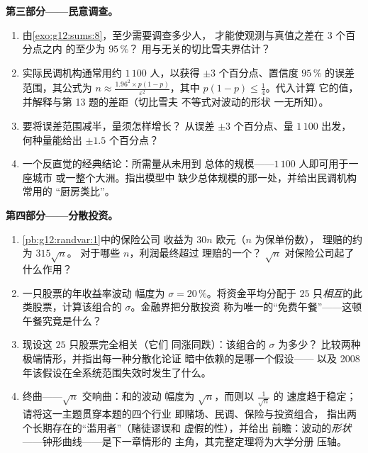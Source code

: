 \begin{problem}
\medskip
\noindent\textbf{第三部分——民意调查。}
\begin{enumerate}[resume]
  \item 由\cref{exo:g12:sums:8}，至少需要调查多少人，
        才能使观测与真值之差在 $3$ 个百分点之内
        的至少为 $95\,\%$？
        用与无关的切比雪夫界估计？
  \item 实际民调机构通常用约 $1\,100$ 人，以获得
        $\pm 3$ 个百分点、置信度 $95\,\%$ 的误差范围，其公式为
        $n \approx \frac{1.96^2 \times p(1-p)}
        {\varepsilon^2}$，其中 $p(1-p) \leq \frac14$。代入计算
        它的值，并解释与第 13 题的差距（切比雪夫
        不等式对波动的形状
        一无所知）。
  \item 要将误差范围减半，量须怎样增长？
        从误差 $\pm 3$ 个百分点、量 $1\,100$ 出发，
        何种量能给出 $\pm 1.5$ 个百分点？
  \item 一个反直觉的经典结论：所需量从未用到
        总体的规模——$1\,100$ 人即可用于一座城市
        或一整个大洲。指出模型中
        缺少总体规模的那一处，并给出民调机构常用的
        “厨房类比”。
\end{enumerate}

\medskip
\noindent\textbf{第四部分——分散投资。}
\begin{enumerate}[resume]
  \item \cref{pb:g12:randvar:1}中的保险公司
        收益为 $30n$ 欧元（$n$ 为保单份数），
        理赔的约为 $315\sqrt n$。
        对于哪些 $n$，利润最终超过
        理赔的一个？
        $\sqrt n$ 对保险公司起了什么作用？
  \item 一只股票的年收益率波动
        幅度为 $\sigma = 20\,\%$。将资金平均分配于 $25$
        只\emph{相互}的此类股票，计算该组合的
        $\sigma$。金融界把分散投资
        称为唯一的“免费午餐”——这顿午餐究竟是什么？
  \item 现设这 $25$ 只股票完全相关（它们
        同涨同跌）：该组合的 $\sigma$ 为多少？
        比较两种极端情形，并指出每一种分散化论证
        暗中依赖的是哪一个假设——
        以及 2008 年该假设在全系统范围失效时发生了什么。
  \item 终曲——$\sqrt n$ 交响曲：和的波动
        幅度为 $\sqrt n$，而则以 $\frac{1}{\sqrt n}$ 的
        速度趋于稳定；请将这一主题贯穿本题的四个行业
        即赌场、民调、保险与投资组合，
        指出两个长期存在的“滥用者”（赌徒谬误和
        虚假的性），并给出
        前瞻：波动的\emph{形状}
        ——钟形曲线——是下一章情形的
        主角，其完整定理将为大学分册
        压轴。
\end{enumerate}
\end{problem}
